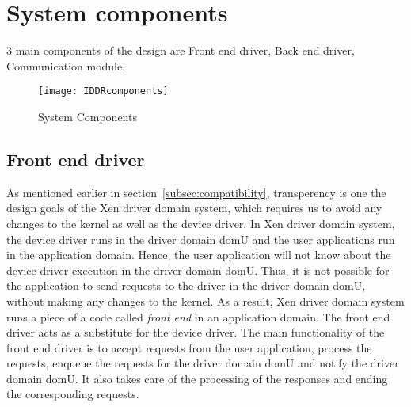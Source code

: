 \section{System components}\label{components}
3 main components of the design are Front end driver, Back end driver, Communication module.
\begin{figure}[!ht]
\centering
\texttt{[image: IDDRcomponents]}
\caption{System Components}
\label{fig:Design Evo1}
\end{figure}

\subsection{Front end driver}
\label{subsec:frontend}
As mentioned earlier in section~\ref{subsec:compatibility}, transperency is one the design goals of the Xen driver domain system, which requires us to avoid any changes to the kernel as well as the device driver. In Xen driver domain system, the device driver runs in the driver domain domU and the user applications run in the application domain. Hence, the user application will not know about the device driver execution in the driver domain domU. Thus, it is not possible for the application to send requests to the driver in the driver domain domU, without making any changes to the kernel. As a result, Xen driver domain system runs a piece of a code called \textit{front end} in an application domain. The front end driver acts as a substitute for the device driver. The main functionality of the front end driver is to accept requests from the user application, process the requests, enqueue the requests for the driver domain domU and notify the driver domain domU. It also takes care of the processing of the responses and ending the corresponding requests.

